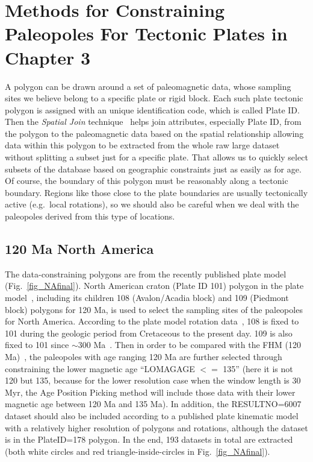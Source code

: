 \chapter{Methods for Constraining Paleopoles For Tectonic Plates in Chapter 3}\label{appen4chp3}

A polygon can be drawn around a set of paleomagnetic data, whose sampling sites
we believe belong to a specific plate or rigid block. Each such plate tectonic
polygon is assigned with an unique identification code, which is called Plate
ID\@. Then the {\em Spatial Join\/} technique~\citep{J07} helps join attributes,
especially Plate ID, from the polygon to the paleomagnetic data based on the
spatial relationship allowing data within this polygon to be extracted from the
whole raw large dataset without splitting a subset just for a specific plate.
That allows us to quickly select subsets of the database based on geographic
constraints just as easily as for age. Of course, the boundary of this polygon
must be reasonably along a tectonic boundary. Regions like those close to the
plate boundaries are usually tectonically active (e.g.\ local rotations), so we
should also be careful when we deal with the paleopoles derived from this type
of locations.

\section{120 Ma North America}

The data-constraining polygons are from the recently published plate
model~\citep{Y18} (Fig.~\ref{fig_NAfinal}). North American craton (Plate ID 101)
polygon in the plate model~\citep{Y18}, including its children 108
(Avalon/Acadia block) and 109 (Piedmont block) polygons for 120 Ma,
is used to select the sampling sites of the paleopoles for North America.
According to the plate model rotation data~\citep{Y18}, 108 is fixed to 101
during the geologic period from Cretaceous to the present day. 109 is also fixed
to 101 since ${\sim}300$ Ma~\citep{C14}. Then in order to be compared with the
FHM (120 Ma)~\citep{M93,M99}, the paleopoles with age ranging
120 Ma are further selected through constraining the lower magnetic
age ``LOMAGAGE $<=$ 135'' (here it is not 120 but 135, because for the lower
resolution case when the window length is 30 Myr, the Age Position Picking
method will include those data with their lower magnetic age between 120 Ma and
135 Ma). In addition, the RESULTNO=6007 dataset should also be included
according to a published plate kinematic model~\citep{Mc06}
with a relatively higher resolution of polygons and
rotations, although the dataset is in the PlateID=178 polygon. In the end, 193
datasets in total are extracted (both white circles and red
triangle-inside-circles in Fig.~\ref{fig_NAfinal}).

